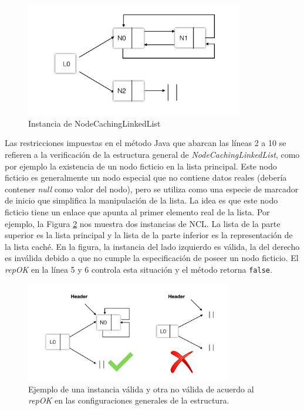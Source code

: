 \begin{figure}[H]
    \centering
    \includegraphics[width=0.85\textwidth]{NCL.jpg}
    \caption{Instancia de NodeCachingLinkedList}
    \label{fig:nclInstanceRepOK}
\end{figure}

Las restricciones impuestas en el método Java que abarcan las líneas 2 a 10 se refieren a la verificación de la estructura general de \emph{NodeCachingLinkedList},
como por ejemplo la existencia de un nodo ficticio en la lista principal. 
Este nodo ficticio es generalmente un nodo especial que no contiene datos reales (debería contener \emph{null} como valor del nodo), pero se utiliza como una especie de marcador de inicio que simplifica la manipulación de la lista. La idea es que este nodo ficticio tiene un enlace que apunta al primer elemento real de la lista. Por ejemplo, la Figura \ref{fig:repOK1} nos muestra dos instancias de NCL. La lista de la parte superior es la lista principal y la lista de la parte inferior es la representación de la lista caché. 
En la figura, la instancia del lado izquierdo es válida, la del derecho es inválida debido a que no cumple la especificación de poseer un nodo ficticio. 
El \emph{repOK} en la línea 5 y 6 controla esta situación y el método retorna \texttt{false}.

\begin{figure}[H]
  \centering
  \includegraphics[width=0.8\textwidth]{images/repok1.jpg}
  \caption{Ejemplo de una instancia válida y otra no válida de acuerdo al \emph{repOK} en las configuraciones generales de la estructura.}
  \label{fig:repOK1}
\end{figure}

